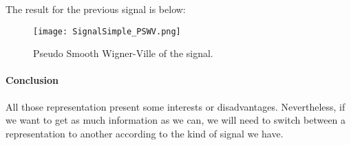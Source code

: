 The result for the previous signal is below:

\begin{figure}[H]
\centering
    \texttt{[image: SignalSimple\_PSWV.png]}
    \caption{Pseudo Smooth Wigner-Ville of the signal.}
    \label{fig:SignalSimple_PSWV}
\end{figure}



\paragraph{Conclusion}
\bigskip
All those representation present some interests or disadvantages. Nevertheless, if we want to get as much information as we can, we will need to switch between a representation to another according to the kind of signal we have.

